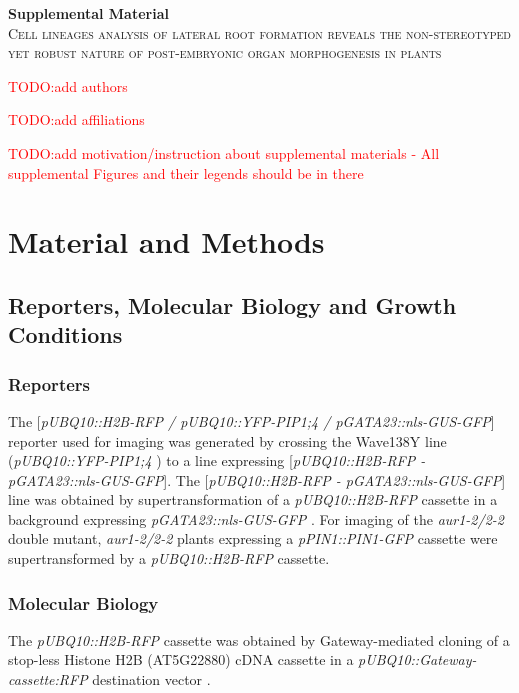 \documentclass[11pt,a4paper, final]{article}
\newcommand{\TODO}[1]{
\textcolor{red}{TODO:#1}
}
\def\baselinestretch{1.0}
\begin{document}
\begin{center}\large
\textbf{Supplemental Material}\\[1em]

\textsc{Cell lineages analysis of lateral root formation reveals the non-stereotyped yet robust nature of post-embryonic organ morphogenesis in plants}

\TODO{add authors}

\TODO{add affiliations}

\end{center}

\setcounter{tocdepth}{2}
\renewcommand{\baselinestretch}{0.5}\normalsize
\tableofcontents
\renewcommand{\baselinestretch}{1}\normalsize

%

\noindent
\TODO{add motivation/instruction about supplemental materials - All supplemental Figures and their legends should be in there}
\clearpage
\section{Material and Methods}
\subsection{Reporters, Molecular Biology and Growth Conditions}
\subsubsection{Reporters}
The [\emph{pUBQ10::H2B-RFP / pUBQ10::YFP-PIP1;4 / pGATA23::nls-GUS-GFP}] reporter used for imaging was generated by crossing the Wave138Y line (\emph{pUBQ10::YFP-PIP1;4} \cite{Geldner:2009bc}) to a line expressing [\emph{pUBQ10::H2B-RFP - pGATA23::nls-GUS-GFP}]. The [\emph{pUBQ10::H2B-RFP - pGATA23::nls-GUS-GFP}] line was obtained by supertransformation of a \emph{pUBQ10::H2B-RFP }cassette in a background expressing \emph{pGATA23::nls-GUS-GFP} \cite{DeRybel:2010ic}. For imaging of the \emph{aur1-2/2-2} double mutant, \emph{aur1-2/2-2} plants expressing a \emph{pPIN1::PIN1-GFP} cassette \cite{Lucas11032013} were supertransformed by a \emph{pUBQ10::H2B-RFP} cassette. 

\subsubsection{Molecular Biology}
The \emph{pUBQ10::H2B-RFP }cassette was obtained by Gateway-mediated cloning of a stop-less Histone H2B (AT5G22880) cDNA cassette in a \emph{pUBQ10::\emph{Gateway-cassette}:RFP }destination vector \cite{Grefen:2010ho}.
\end{document}
